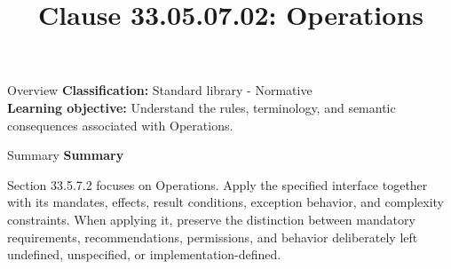 \documentclass[10pt,letterpaper]{article}
\title{Clause 33.05.07.02: Operations}
\author{}
\date{}
\begin{document}
\maketitle
\begin{CornellOverviewBox}{Overview}
\textbf{Classification:} Standard library - Normative\\[2pt]
\textbf{Learning objective:} Understand the rules, terminology, and semantic consequences associated with Operations.
\end{CornellOverviewBox}\begin{CornellSummaryBox}{Summary}
{\sffamily\bfseries\color{Accent} Summary}\par\vspace{3pt}Section 33.5.7.2 focuses on Operations. Apply the specified interface together with its mandates, effects, result conditions, exception behavior, and complexity constraints. When applying it, preserve the distinction between mandatory requirements, recommendations, permissions, and behavior deliberately left undefined, unspecified, or implementation-defined.
\end{CornellSummaryBox}
\end{document}
